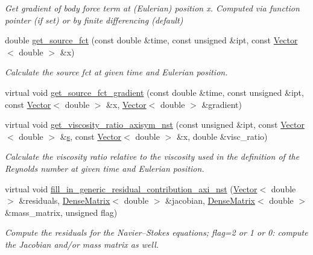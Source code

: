 \begin{DoxyCompactItemize}
\begin{DoxyCompactList}\small\item\em Get gradient of body force term at (Eulerian) position x. Computed via function pointer (if set) or by finite differencing (default) \end{DoxyCompactList}\item 
double \hyperlink{classoomph_1_1AxisymmetricNavierStokesEquations_a7b965ac308b3a398a9365d76aa21a65f}{get\+\_\+source\+\_\+fct} (const double \&time, const unsigned \&ipt, const \hyperlink{classoomph_1_1Vector}{Vector}$<$ double $>$ \&x)
\begin{DoxyCompactList}\small\item\em Calculate the source fct at given time and Eulerian position. \end{DoxyCompactList}\item 
virtual void \hyperlink{classoomph_1_1AxisymmetricNavierStokesEquations_a9b7e10587877daae2ef6be75cc35bef8}{get\+\_\+source\+\_\+fct\+\_\+gradient} (const double \&time, const unsigned \&ipt, const \hyperlink{classoomph_1_1Vector}{Vector}$<$ double $>$ \&x, \hyperlink{classoomph_1_1Vector}{Vector}$<$ double $>$ \&gradient)
\item 
virtual void \hyperlink{classoomph_1_1AxisymmetricNavierStokesEquations_a6b75b0e3184053cbf32458df944ec330}{get\+\_\+viscosity\+\_\+ratio\+\_\+axisym\+\_\+nst} (const unsigned \&ipt, const \hyperlink{classoomph_1_1Vector}{Vector}$<$ double $>$ \&\hyperlink{cfortran_8h_ab7123126e4885ef647dd9c6e3807a21c}{s}, const \hyperlink{classoomph_1_1Vector}{Vector}$<$ double $>$ \&x, double \&visc\+\_\+ratio)
\begin{DoxyCompactList}\small\item\em Calculate the viscosity ratio relative to the viscosity used in the definition of the Reynolds number at given time and Eulerian position. \end{DoxyCompactList}\item 
virtual void \hyperlink{classoomph_1_1AxisymmetricNavierStokesEquations_a9a19729ca5b08abca8e8202614e70b29}{fill\+\_\+in\+\_\+generic\+\_\+residual\+\_\+contribution\+\_\+axi\+\_\+nst} (\hyperlink{classoomph_1_1Vector}{Vector}$<$ double $>$ \&residuals, \hyperlink{classoomph_1_1DenseMatrix}{Dense\+Matrix}$<$ double $>$ \&jacobian, \hyperlink{classoomph_1_1DenseMatrix}{Dense\+Matrix}$<$ double $>$ \&mass\+\_\+matrix, unsigned flag)
\begin{DoxyCompactList}\small\item\em Compute the residuals for the Navier--Stokes equations; flag=2 or 1 or 0\+: compute the Jacobian and/or mass matrix as well. \end{DoxyCompactList}\item 

\end{DoxyCompactItemize}
